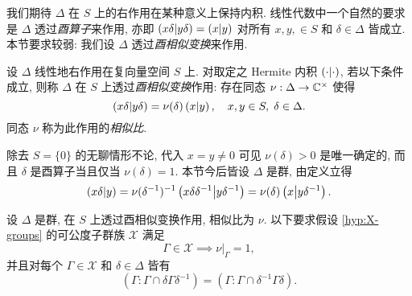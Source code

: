 我们期待 $\Delta$ 在 $S$ 上的右作用在某种意义上保持内积. 线性代数中一个自然的要求是 $\Delta$ 透过\emph{酉算子}来作用, 亦即 $\left( x\delta \middle| y\delta \right) = \left( x \middle| y \right)$ 对所有 $x,y, \in S$ 和 $\delta \in \Delta$ 皆成立. 本节要求较弱: 我们设 $\Delta$ 透过\emph{酉相似变换}来作用.

\begin{definition}  
	设 $\Delta$ 线性地右作用在复向量空间 $S$ 上. 对取定之 Hermite 内积 $\left( \cdot \middle| \cdot \right)$, 若以下条件成立, 则称 $\Delta$ 在 $S$ 上透过\emph{酉相似变换}作用: 存在同态 $\nu: \Delta \to \mathbb{C}^\times$ 使得
	\[ \left( x\delta \middle| y\delta \right) = \nu(\delta) \left( x \middle| y \right), \quad x,y \in S, \; \delta \in \Delta. \]
	同态 $\nu$ 称为此作用的\emph{相似比}.
\end{definition}

除去 $S = \{0\}$ 的无聊情形不论, 代入 $x=y \neq 0$ 可见 $\nu(\delta) > 0$ 是唯一确定的, 而且 $\delta$ 是酉算子当且仅当 $\nu(\delta)=1$. 本节今后皆设 $\Delta$ 是群, 由定义立得
\begin{equation}\label{eqn:Delta-adjoint}
	\left( x\delta \middle| y \right) = \nu(\delta^{-1})^{-1} \left( x\delta\delta^{-1} \middle| y\delta^{-1} \right) = \nu(\delta) \left( x \middle| y\delta^{-1} \right).
\end{equation}

\begin{hypothesis}\label{hyp:Hermitian-form}
	设 $\Delta$ 是群, 在 $S$ 上透过酉相似变换作用, 相似比为 $\nu$. 以下要求假设 \ref{hyp:X-groups} 的可公度子群族 $\mathcal{X}$ 满足
	\begin{equation}\label{eqn:triviality-hypothesis}
		\Gamma \in \mathcal{X} \implies \nu|_\Gamma = 1,
	\end{equation}
	并且对每个 $\Gamma \in \mathcal{X}$ 和 $\delta \in \Delta$ 皆有
	\begin{equation}\label{eqn:coset-hypothesis}
		(\Gamma : \Gamma \cap \delta\Gamma\delta^{-1}) = (\Gamma: \Gamma \cap \delta^{-1}\Gamma\delta).
	\end{equation}
\end{hypothesis}


